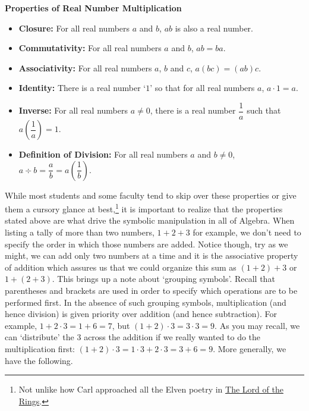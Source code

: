 \medskip

\label{realnumbermultiplication}

\colorbox{ResultColor}{\bbm

\centerline{\textbf{Properties of Real Number Multiplication}}

\begin{itemize}

\item  \textbf{Closure:}  For all real numbers $a$ and $b$,  $ab$ is also a real number.

\item  \textbf{Commutativity:}  For all real numbers $a$ and $b$, $ab = ba$.

\item  \textbf{Associativity:}  For all real numbers $a$, $b$ and $c$, $a(bc) = (ab)c$.

\item  \textbf{Identity:}  There is a real number `$1$' so that for all real numbers $a$, $a \cdot 1 = a$.

\item  \textbf{Inverse:}  For all real numbers $a \neq 0$, there is a real number $\dfrac{1}{a}$ such that $a \left(\dfrac{1}{a}\right) = 1$.

\item \textbf{Definition of Division:}  For all real numbers $a$ and $b \neq 0$, $a \div b = \dfrac{a}{b} = a  \left(\dfrac{1}{b}\right)$.

\end{itemize}

\ebm}

\medskip

While most students and some faculty tend to skip over these properties or give them a cursory glance at best,\footnote{Not unlike how Carl approached all the Elven poetry in \underline{The Lord of the Rings}.} it is important to realize that the properties stated above are what drive the symbolic manipulation in all of Algebra.  When listing a tally of more than two numbers, $1 + 2 + 3$\label{howtoaddonetwothree} for example, we don't need to specify the order in which those numbers are added. Notice though, try as we might, we can add only two numbers at a time and it is the associative property of addition which assures us that we could organize this sum as $(1+2) + 3$ or $1+(2+3)$.  This brings up a note about `grouping symbols'.  Recall that parentheses and brackets are used in order to specify which operations are to be performed first.  In the absence of such grouping symbols, multiplication (and hence division) is given priority over addition (and hence subtraction). For example, $1 + 2 \cdot 3 = 1+6 = 7$, but $(1+2) \cdot 3 = 3 \cdot 3 = 9$.  As you may recall, we can `distribute' the $3$ across the addition if we really wanted to do the multiplication first:  $(1+2) \cdot 3 = 1\cdot 3 + 2 \cdot 3 = 3 + 6 = 9$. More generally, we have the following.


